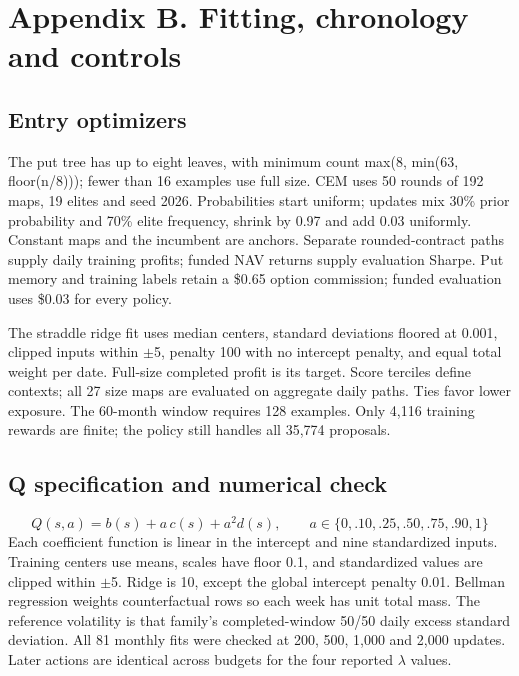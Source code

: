 \documentclass[11pt,letterpaper]{article}
\begin{document}
\clearpage
\section*{Appendix B. Fitting, chronology and controls}
\subsection*{Entry optimizers}
The put tree has up to eight leaves, with minimum count max(8, min(63, floor(n/8))); fewer than 16 examples use full size. CEM uses 50 rounds of 192 maps, 19 elites and seed 2026. Probabilities start uniform; updates mix 30\% prior probability and 70\% elite frequency, shrink by 0.97 and add 0.03 uniformly. Constant maps and the incumbent are anchors. Separate rounded-contract paths supply daily training profits; funded NAV returns supply evaluation Sharpe. Put memory and training labels retain a \$0.65 option commission; funded evaluation uses \$0.03 for every policy.

The straddle ridge fit uses median centers, standard deviations floored at 0.001, clipped inputs within \ensuremath{\pm}5, penalty 100 with no intercept penalty, and equal total weight per date. Full-size completed profit is its target. Score terciles define contexts; all 27 size maps are evaluated on aggregate daily paths. Ties favor lower exposure. The 60-month window requires 128 examples. Only 4,116 training rewards are finite; the policy still handles all 35,774 proposals.

\subsection*{Q specification and numerical check}
\[Q(s,a)=b(s)+a\,c(s)+a^2d(s),\qquad a\in\{0,.10,.25,.50,.75,.90,1\}\]
Each coefficient function is linear in the intercept and nine standardized inputs. Training centers use means, scales have floor 0.1, and standardized values are clipped within \ensuremath{\pm}5. Ridge is 10, except the global intercept penalty 0.01. Bellman regression weights counterfactual rows so each week has unit total mass. The reference volatility is that family's completed-window 50/50 daily excess standard deviation. All 81 monthly fits were checked at 200, 500, 1,000 and 2,000 updates. Later actions are identical across budgets for the four reported \ensuremath{\lambda} values.
\end{document}
